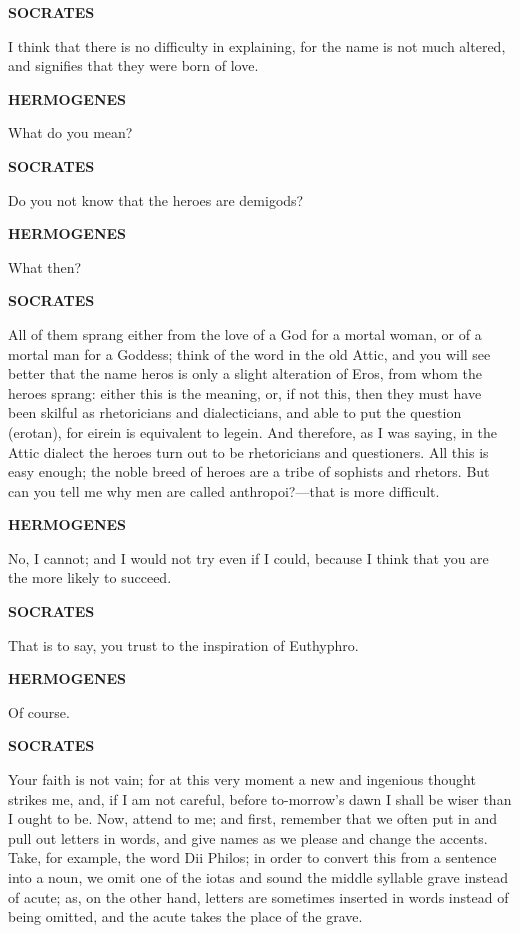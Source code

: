 \documentclass[11pt,letter]{article}
\begin{document}
\par \textbf{SOCRATES}
\par   I think that there is no difficulty in explaining, for the name is not much altered, and signifies that they were born of love.

\par \textbf{HERMOGENES}
\par   What do you mean?

\par \textbf{SOCRATES}
\par   Do you not know that the heroes are demigods?

\par \textbf{HERMOGENES}
\par   What then?

\par \textbf{SOCRATES}
\par   All of them sprang either from the love of a God for a mortal woman, or of a mortal man for a Goddess; think of the word in the old Attic, and you will see better that the name heros is only a slight alteration of Eros, from whom the heroes sprang:  either this is the meaning, or, if not this, then they must have been skilful as rhetoricians and dialecticians, and able to put the question (erotan), for eirein is equivalent to legein. And therefore, as I was saying, in the Attic dialect the heroes turn out to be rhetoricians and questioners. All this is easy enough; the noble breed of heroes are a tribe of sophists and rhetors. But can you tell me why men are called anthropoi?—that is more difficult.

\par \textbf{HERMOGENES}
\par   No, I cannot; and I would not try even if I could, because I think that you are the more likely to succeed.

\par \textbf{SOCRATES}
\par   That is to say, you trust to the inspiration of Euthyphro.

\par \textbf{HERMOGENES}
\par   Of course.

\par \textbf{SOCRATES}
\par   Your faith is not vain; for at this very moment a new and ingenious thought strikes me, and, if I am not careful, before to-morrow’s dawn I shall be wiser than I ought to be. Now, attend to me; and first, remember that we often put in and pull out letters in words, and give names as we please and change the accents. Take, for example, the word Dii Philos; in order to convert this from a sentence into a noun, we omit one of the iotas and sound the middle syllable grave instead of acute; as, on the other hand, letters are sometimes inserted in words instead of being omitted, and the acute takes the place of the grave.
\end{document}
